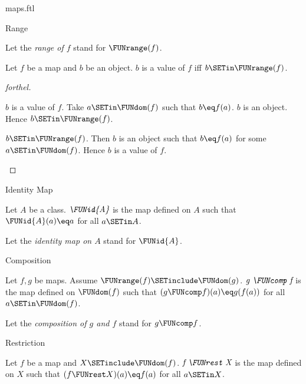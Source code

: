 \documentclass{naproche-library}
\begin{document}
\begin{smodule}[title=Maps]{maps.ftl}
\begin{sfragment}{Range}
\begin{definition}[forthel,id=FOUNDATIONS_06_1938831225913344]
    Let the \emph{range of $f$} stand for $\FUNrange(f)$.
  \end{definition}

  \begin{proposition}[forthel,id=FOUNDATIONS_06_6386349418479616]
    Let $f$ be a map and $b$ be an object.
    $b$ is a value of $f$ iff $b \SETin \FUNrange(f)$.
  \end{proposition}
  \begin{proof}[forthel]
    \begin{case}{$b$ is a value of $f$.}
      Take $a \SETin \FUNdom(f)$ such that $b \eq f(a)$.
      $b$ is an object.
      Hence $b \SETin \FUNrange(f)$.
    \end{case}

    \begin{case}{$b \SETin \FUNrange(f)$.}
      Then $b$ is an object such that $b \eq f(a)$ for some $a \SETin \FUNdom(f)$.
      Hence $b$ is a value of $f$.
    \end{case}
  \end{proof}
\end{sfragment}

\begin{sfragment}{Identity Map}
  \begin{definition}[forthel,id=FOUNDATIONS_06_1920902360989696]
    Let $A$ be a class.
    $\emph{\FUNid{A}}$ is the map defined on $A$ such that $\FUNid{A}(a) \eq a$ for all $a \SETin A$.

    Let the \emph{identity map on $A$} stand for $\FUNid{A}$.
  \end{definition}
\end{sfragment}

\begin{sfragment}{Composition}
  \begin{definition}[forthel,id=FOUNDATIONS_06_7605717729017856]
    Let $f, g$ be maps.
    Assume $\FUNrange(f) \SETinclude \FUNdom(g)$.
    $\emph{g \FUNcomp f}$ is the map defined on $\FUNdom(f)$ such that $(g \FUNcomp f)(a) \eq g(f(a))$ for all $a \SETin \FUNdom(f)$.

    Let the \emph{composition of $g$ and $f$} stand for $g \FUNcomp f$.
  \end{definition}
\end{sfragment}

\begin{sfragment}{Restriction}
  \begin{definition}[forthel,id=FOUNDATIONS_06_7095412741636096]
    Let $f$ be a map and $X \SETinclude \FUNdom(f)$.
    $\emph{f \FUNrest X}$ is the map defined on $X$ such that $(f \FUNrest X)(a) \eq f(a)$ for all $a \SETin X$.


\end{definition}
\end{sfragment}
\end{smodule}
\end{document}
